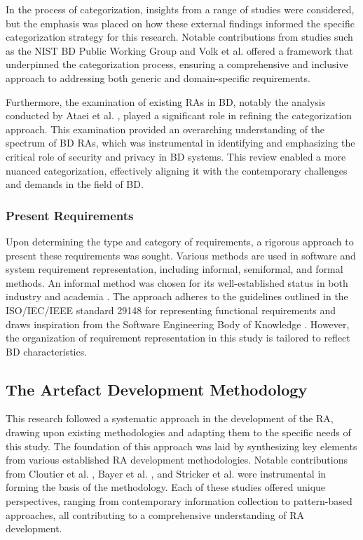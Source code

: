\documentclass[review]{elsarticle}
\begin{document}
In the process of categorization, insights from a range of studies were considered, but the emphasis was placed on how these external findings informed the specific categorization strategy for this research. Notable contributions from studies such as the NIST BD Public Working Group and Volk et al. \cite{volk2020identifying} offered a framework that underpinned the categorization process, ensuring a comprehensive and inclusive approach to addressing both generic and domain-specific requirements.

Furthermore, the examination of existing RAs in BD, notably the analysis conducted by Ataei et al. \cite{ataei2020big}, played a significant role in refining the categorization approach. This examination provided an overarching understanding of the spectrum of BD RAs, which was instrumental in identifying and emphasizing the critical role of security and privacy in BD systems. This review enabled a more nuanced categorization, effectively aligning it with the contemporary challenges and demands in the field of BD.



\subsubsection{Present Requirements}

Upon determining the type and category of requirements, a rigorous approach to present these requirements was sought. Various methods are used in software and system requirement representation, including informal, semiformal, and formal methods. An informal method was chosen for its well-established status in both industry and academia \cite{kassab2014state}. The approach adheres to the guidelines outlined in the ISO/IEC/IEEE standard 29148 \cite{ISO29148} for representing functional requirements and draws inspiration from the Software Engineering Body of Knowledge \cite{abran2004software}. However, the organization of requirement representation in this study is tailored to reflect BD characteristics.




\subsection{The Artefact Development Methodology}

This research followed a systematic approach in the development of the RA, drawing upon existing methodologies and adapting them to the specific needs of this study. The foundation of this approach was laid by synthesizing key elements from various established RA development methodologies. Notable contributions from Cloutier et al. \cite{Cloutier}, Bayer et al. \cite{bayer2004definition}, and Stricker et al. \cite{stricker2010creating} were instrumental in forming the basis of the methodology. Each of these studies offered unique perspectives, ranging from contemporary information collection to pattern-based approaches, all contributing to a comprehensive understanding of RA development.
\end{document}
